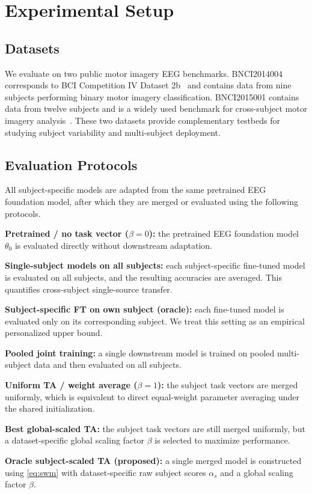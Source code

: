 \documentclass[conference]{IEEEtran}
\begin{document}
\section{Experimental Setup}
\subsection{Datasets}
We evaluate on two public motor imagery EEG benchmarks. BNCI2014004 corresponds to BCI Competition IV Dataset 2b~\cite{b8} and contains data from nine subjects performing binary motor imagery classification. BNCI2015001 contains data from twelve subjects and is a widely used benchmark for cross-subject motor imagery analysis~\cite{b9}. These two datasets provide complementary testbeds for studying subject variability and multi-subject deployment.

\subsection{Evaluation Protocols}
All subject-specific models are adapted from the same pretrained EEG foundation model, after which they are merged or evaluated using the following protocols.

\textbf{Pretrained / no task vector ($\beta=0$):} the pretrained EEG foundation model $\theta_0$ is evaluated directly without downstream adaptation.

\textbf{Single-subject models on all subjects:} each subject-specific fine-tuned model is evaluated on all subjects, and the resulting accuracies are averaged. This quantifies cross-subject single-source transfer.

\textbf{Subject-specific FT on own subject (oracle):} each fine-tuned model is evaluated only on its corresponding subject. We treat this setting as an empirical personalized upper bound.

\textbf{Pooled joint training:} a single downstream model is trained on pooled multi-subject data and then evaluated on all subjects.

\textbf{Uniform TA / weight average ($\beta=1$):} the subject task vectors are merged uniformly, which is equivalent to direct equal-weight parameter averaging under the shared initialization.

\textbf{Best global-scaled TA:} the subject task vectors are still merged uniformly, but a dataset-specific global scaling factor $\beta$ is selected to maximize performance.

\textbf{Oracle subject-scaled TA (proposed):} a single merged model is constructed using \eqref{eq:swm} with dataset-specific raw subject scores $\alpha_s$ and a global scaling factor $\beta$.
\end{document}
